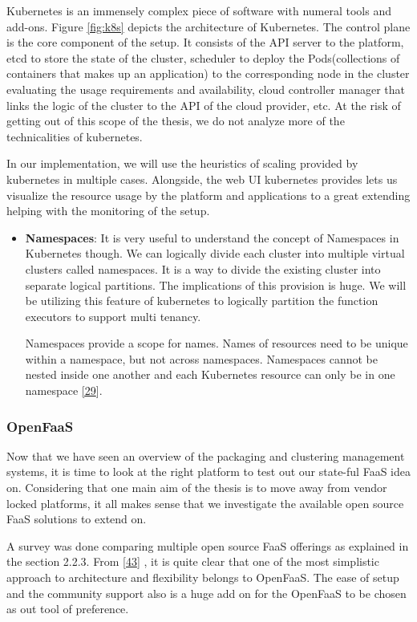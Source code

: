 \documentclass[12pt,titlepage]{article}
\begin{document}
Kubernetes is an immensely complex piece of software with numeral tools and
add-ons. Figure \ref{fig:k8s} depicts the architecture of Kubernetes. The control plane is
the core component of the setup. It consists of the API server to the platform,
etcd to store the state of the cluster, scheduler to deploy the Pods(collections
of containers that makes up an application) to the corresponding node in the
cluster evaluating the usage requirements and availability, cloud controller
manager that links the logic of the cluster to the API of the cloud provider,
etc. At the risk of getting out of this scope of the thesis, we do not analyze
more of the technicalities of kubernetes.

In our implementation, we will use the heuristics of scaling provided by
kubernetes in multiple cases. Alongside, the web UI kubernetes provides lets us
visualize the resource usage by the platform and applications to a great
extending helping with the monitoring of the setup.

\begin{itemize}
\item \textbf{Namespaces}: It is very useful to understand the concept of Namespaces in Kubernetes though.
We can logically divide each cluster into multiple virtual clusters called
namespaces. It is a way to divide the existing cluster into separate logical
partitions. The implications of this provision is huge. We will be utilizing
this feature of kubernetes to logically partition the function executors to
support multi tenancy.

Namespaces provide a scope for names. Names of resources need to be unique
within a namespace, but not across namespaces. Namespaces cannot be nested
inside one another and each Kubernetes resource can only be in one namespace \hyperref[ref:29]{[29}].
\end{itemize}


\subsubsection{OpenFaaS}
\label{sec:org5353cd7}
Now that we have seen an overview of the packaging and clustering management
systems, it is time to look at the right platform to test out our state-ful FaaS
idea on. Considering that one main aim of the thesis is to move away from vendor
locked platforms, it all makes sense that we investigate the available open
source FaaS solutions to extend on.

A survey was done comparing multiple open source FaaS offerings as explained in
the section 2.2.3. From  \hyperref[ref:43]{[43}] , it is quite clear that one of the most
simplistic approach to architecture and flexibility belongs to OpenFaaS. The
ease of setup and the community support also is a huge add on for the OpenFaaS
to be chosen as out tool of preference.
\end{document}
